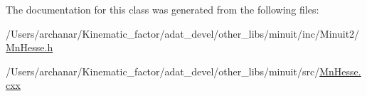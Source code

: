 The documentation for this class was generated from the following files\+:\begin{DoxyCompactItemize}
\item 
/\+Users/archanar/\+Kinematic\+\_\+factor/adat\+\_\+devel/other\+\_\+libs/minuit/inc/\+Minuit2/\mbox{\hyperlink{other__libs_2minuit_2inc_2Minuit2_2MnHesse_8h}{Mn\+Hesse.\+h}}\item 
/\+Users/archanar/\+Kinematic\+\_\+factor/adat\+\_\+devel/other\+\_\+libs/minuit/src/\mbox{\hyperlink{MnHesse_8cxx}{Mn\+Hesse.\+cxx}}\end{DoxyCompactItemize}
